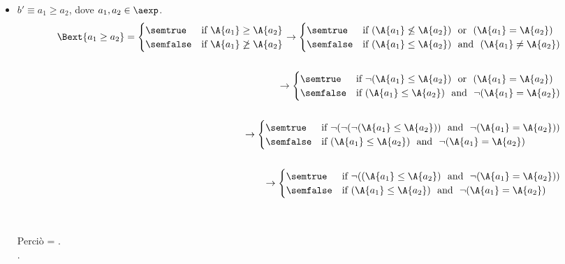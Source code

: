 {\begin{enumerate}[label=(\alph*)]
\begin{itemize}
    \item $ b' \equiv a_1 \geq a_2$, dove $a_1, a_2 \in \aexp$. \\
    \begin{align*}
      \Bext{a_1 \geq a_2} = 
      \begin{cases} 
      \semtrue & 
      \mbox{if} \ \A{a_1} \geq \A{a_2}\\ 
      \semfalse & 
      \mbox{if} \ \A{a_1} \not \geq \A{a_2}\\
      \end{cases} 
      \rightarrow
      \begin{cases} 
      \semtrue & 
      \mbox{if} \ (\A{a_1} \not \leq \A{a_2})  \ \mbox{ or } \ (\A{a_1} = \A{a_2})\\ 
      \semfalse & 
      \mbox{if} \  (\A{a_1} \leq \A{a_2})  \ \mbox{ and } \ (\A{a_1} \not = \A{a_2})\\
      \end{cases} \\ \\
      \rightarrow
      \begin{cases} 
      \semtrue & 
      \mbox{if} \ \lnot (\A{a_1} \leq \A{a_2})  \ \mbox{ or } \ (\A{a_1} = \A{a_2})\\ 
      \semfalse & 
      \mbox{if} \  (\A{a_1} \leq \A{a_2})  \ \mbox{ and } \ \lnot (\A{a_1} = \A{a_2})\\
      \end{cases} \\ \\ 
      \rightarrow
      \begin{cases} 
      \semtrue & 
      \mbox{if} \ \lnot ( \lnot ( \lnot (\A{a_1} \leq \A{a_2}))  \ \mbox{ and } \ \lnot (\A{a_1} = \A{a_2}))\\ 
      \semfalse & 
      \mbox{if} \  (\A{a_1} \leq \A{a_2})  \ \mbox{ and } \ \lnot (\A{a_1} = \A{a_2})\\
      \end{cases} \\ \\ 
      \rightarrow
      \begin{cases} 
      \semtrue & 
      \mbox{if} \ \lnot ( (\A{a_1} \leq \A{a_2})  \ \mbox{ and } \ \lnot (\A{a_1} = \A{a_2}))\\ 
      \semfalse & 
      \mbox{if} \  (\A{a_1} \leq \A{a_2})  \ \mbox{ and } \ \lnot (\A{a_1} = \A{a_2})\\
      \end{cases} \\ \\ 
    \end{align*} \\
      Perciò  =
      . \\.


\end{itemize}
\end{enumerate}}
